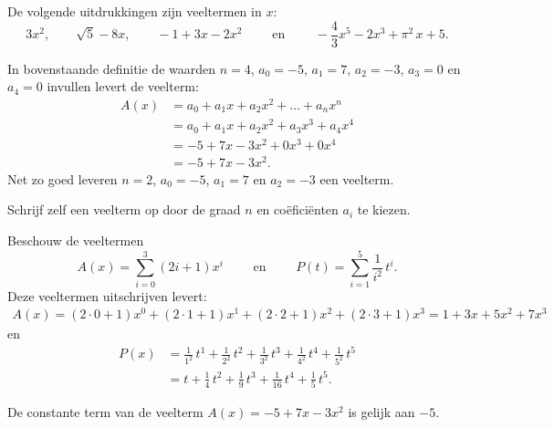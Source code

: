 \documentclass{ximera}
\begin{document}
\begin{example} 
De volgende uitdrukkingen zijn veeltermen in \(x\):
\[
3x^2, 
\qquad \sqrt{5} - 8x, 
\qquad -1 + 3x -2x^2 
\qquad \text{ en } \qquad -\frac{4}{3}x^5 - 2x^3 + \pi^2\,x + 5. 
\]      
\end{example} 
    

\begin{example} 
In bovenstaande definitie de waarden \(n = 4\), \(a_0 = -5\), \(a_1 = 7\), \(a_2 = -3\), \(a_3 = 0\) en \(a_4 = 0\) invullen levert de veelterm: 
\begin{align*}
A(x) 
& = a_0 + a_1x + a_2x^2 + \dots + a_n x^n \\
& = a_0 + a_1x + a_2x^2 + a_3 x^3 + a_4 x^4 \\ 
& = -5 + 7x - 3x^2 + 0x^3 + 0x^4 \\
& = -5 + 7x - 3x^2.
\end{align*}
Net zo goed leveren \(n = 2\), \(a_0 = -5\), \(a_1 = 7\) en \(a_2 = -3\) een veelterm.
\end{example} 

\begin{exercise}
Schrijf zelf een veelterm op door de graad \(n\) en coëficiënten \(a_i\) te kiezen.
\end{exercise}

\begin{example} 
Beschouw de veeltermen
\[
A(x) = \sum_{i=0}^3 (2i+1) x^i \qquad \text{ en } \qquad P(t) = \sum_{i=1}^5 \frac{1}{i^2} \, t^i.
\] 
Deze veeltermen uitschrijven levert: 
\begin{align*}
A(x)  = (2\cdot0+1)x^0 + (2\cdot1+1)x^1 + (2\cdot2+1)x^2 + (2\cdot3+1)x^3 = 1 + 3x + 5x^2 + 7x^3
\end{align*}
en
\begin{align*}
P(x) 
& = \frac{1}{1^2} \, t^1 + \frac{1}{2^2} \, t^2 + \frac{1}{3^2} \, t^3 + \frac{1}{4^2} \, t^4 + \frac{1}{5^2} \, t^5 \\
& = t + \frac{1}{4}\,t^2 + \frac{1}{9}\,t^3 + \frac{1}{16}\,t^4 + \frac{1}{5}\,t^5.
\end{align*}
\end{example} 



\begin{example} 
De constante term van de veelterm \(A(x) = -5 + 7x - 3x^2\) is gelijk aan \(-5\).  
\end{example} 
\end{document}
